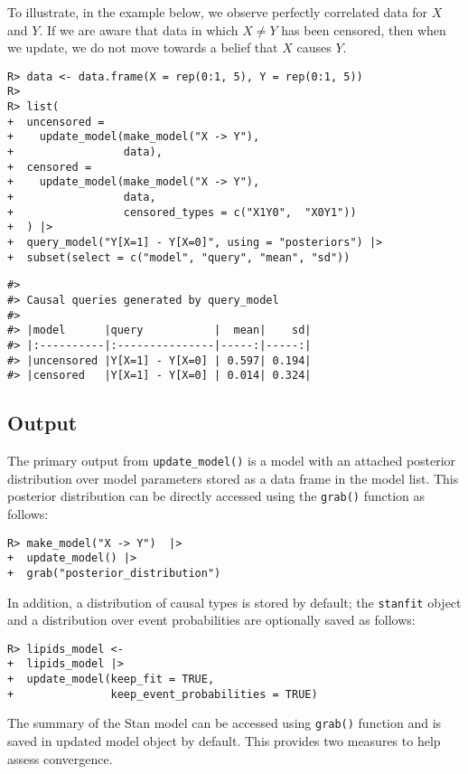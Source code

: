 \documentclass[
  11pt,
  article]{jss}
\begin{document}
To illustrate, in the example below, we observe perfectly correlated
data for \(X\) and \(Y\). If we are aware that data in which
\(X \neq Y\) has been censored, then when we update, we do not move
towards a belief that \(X\) causes \(Y\).

\begin{verbatim}
R> data <- data.frame(X = rep(0:1, 5), Y = rep(0:1, 5))
R> 
R> list(
+  uncensored = 
+    update_model(make_model("X -> Y"),
+                 data),
+  censored = 
+    update_model(make_model("X -> Y"), 
+                 data, 
+                 censored_types = c("X1Y0",  "X0Y1"))
+  ) |>
+  query_model("Y[X=1] - Y[X=0]", using = "posteriors") |> 
+  subset(select = c("model", "query", "mean", "sd"))
\end{verbatim}

\begin{verbatim}
#> 
#> Causal queries generated by query_model
#> 
#> |model      |query           |  mean|    sd|
#> |:----------|:---------------|-----:|-----:|
#> |uncensored |Y[X=1] - Y[X=0] | 0.597| 0.194|
#> |censored   |Y[X=1] - Y[X=0] | 0.014| 0.324|
\end{verbatim}

\hypertarget{output}{%
\subsection{Output}\label{output}}

The primary output from \texttt{update\_model()} is a model with an
attached posterior distribution over model parameters stored as a data
frame in the model list. This posterior distribution can be directly
accessed using the \texttt{grab()} function as follows:

\begin{verbatim}
R> make_model("X -> Y")  |> 
+  update_model() |>
+  grab("posterior_distribution")  
\end{verbatim}

In addition, a distribution of causal types is stored by default; the
\texttt{stanfit} object and a distribution over event probabilities are
optionally saved as follows:

\begin{verbatim}
R> lipids_model <- 
+  lipids_model |> 
+  update_model(keep_fit = TRUE,
+               keep_event_probabilities = TRUE)
\end{verbatim}

The summary of the Stan model can be accessed using \texttt{grab()}
function and is saved in updated model object by default. This provides
two measures to help assess convergence.
\end{document}

